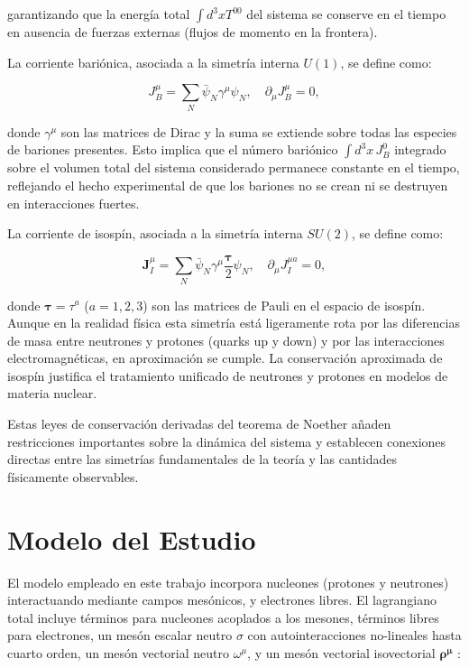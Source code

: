 garantizando que la energía total $\int d^3x T^{00}$ del sistema se conserve en el tiempo en ausencia de fuerzas externas (flujos de momento en la frontera).

La corriente bariónica, asociada a la simetría interna $U(1)$, se define como:

\begin{equation}
	J_B^\mu = \sum_N \bar{\psi}_N \gamma^\mu \psi_N, \quad \partial_\mu J_B^\mu = 0,
	\label{eq:corriente_barionica}
\end{equation}

donde $\gamma^\mu$ son las matrices de Dirac y la suma se extiende sobre todas las especies de bariones presentes. Esto implica que el número bariónico $\int d^3x \, J_B^0$ integrado sobre el volumen total del sistema considerado permanece constante en el tiempo, reflejando el hecho experimental de que los bariones no se crean ni se destruyen en interacciones fuertes.

La corriente de isospín, asociada a la simetría interna $SU(2)$, se define como:

\begin{equation}
	\boldsymbol{J}_I^{\mu} = \sum_N \bar{\psi}_N \gamma^\mu \frac{\boldsymbol{\tau}}{2} \psi_N, \quad \partial_\mu J_I^{\mu a} = 0,
	\label{eq:corriente_isospin}
\end{equation}

donde $\boldsymbol{\tau} = \tau^a$ ($a = 1, 2, 3$) son las matrices de Pauli en el espacio de isospín. Aunque en la realidad física esta simetría está ligeramente rota por las diferencias de masa entre neutrones y protones (quarks up y down) y por las interacciones electromagnéticas, en aproximación se cumple. La conservación aproximada de isospín justifica el tratamiento unificado de neutrones y protones en modelos de materia nuclear.

Estas leyes de conservación derivadas del teorema de Noether añaden restricciones importantes sobre la dinámica del sistema y establecen conexiones directas entre las simetrías fundamentales de la teoría y las cantidades físicamente observables.


\section{Modelo del Estudio}
\label{sec:modelo}

El modelo empleado en este trabajo incorpora nucleones (protones y neutrones) interactuando mediante campos mesónicos, y electrones libres. El lagrangiano total incluye términos para nucleones acoplados a los mesones, términos libres para electrones, un mesón escalar neutro $\sigma$ con autointeracciones no-lineales hasta cuarto orden, un mesón vectorial neutro $\omega^\mu$, y un mesón vectorial isovectorial $\boldsymbol{\rho^\mu}$ \cite{glendenningCompactStarsNuclear2000}:


